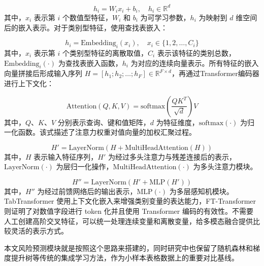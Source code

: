 \begin{equation}
    h_i = W_i x_i + b_i, \quad h_i \in \mathbb{R}^d
    \label{eq:numeric-embed}
\end{equation}
其中，$x_i$ 表示第 $i$ 个数值型特征，$W_i$ 和 $b_i$ 为可学习参数，$h_i$ 为映射到 $d$ 维空间后的嵌入表示。对于类别型特征，使用查找表嵌入：

\begin{equation}
    h_i = \text{Embedding}_i(x_i), \quad x_i \in \{1,2,\ldots,C_i\}
    \label{eq:categorical-embed}
\end{equation}
其中，$x_i$ 表示第 $i$ 个类别型特征的离散取值，$C_i$ 表示该特征的类别总数，$\text{Embedding}_i(\cdot)$ 为查找表嵌入函数，$h_i$ 为对应的连续向量表示。所有特征的嵌入向量拼接后形成输入序列 $H = [h_1; h_2; \ldots; h_F] \in \mathbb{R}^{F \times d}$，再通过Transformer编码器进行上下文化：

\begin{equation}
    \text{Attention}(Q,K,V) = \text{softmax}\left(\frac{QK^T}{\sqrt{d}}\right)V
    \label{eq:attention}
\end{equation}
其中，$Q$、$K$、$V$ 分别表示查询、键和值矩阵，$d$ 为特征维度，$\text{softmax}(\cdot)$ 为归一化函数。该式描述了注意力权重对值向量的加权汇聚过程。

\begin{equation}
    H' = \text{LayerNorm}(H + \text{MultiHeadAttention}(H))
    \label{eq:transformer1}
\end{equation}
其中，$H$ 表示输入特征序列，$H'$ 为经过多头注意力与残差连接后的表示，$\text{LayerNorm}(\cdot)$ 为层归一化操作，$\text{MultiHeadAttention}(\cdot)$ 为多头注意力模块。

\begin{equation}
    H'' = \text{LayerNorm}(H' + \text{MLP}(H'))
    \label{eq:transformer2}
\end{equation}
其中，$H''$ 为经过前馈网络后的输出表示，$\text{MLP}(\cdot)$ 为多层感知机模块。TabTransformer 使用上下文化嵌入来增强类别变量的表达能力，FT-Transformer 则证明了对数值字段进行 token 化并且使用 Transformer 编码的有效性\cite{tabtransformer2020,fttransformer2021}。不需要人工创建高阶交叉特征，可以统一处理连续变量和离散变量，给多模态融合提供比较灵活的表示方式。

本文风险预测模块就是按照这个思路来搭建的，同时研究中也保留了随机森林和梯度提升树等传统的集成学习方法，作为小样本表格数据上的重要对比基线\cite{breiman2001rf,chen2016xgboost,hastie2009elements}。


